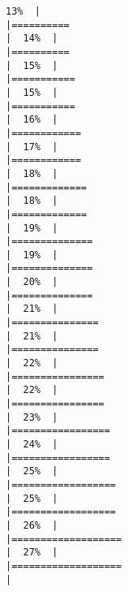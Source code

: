 \documentclass[
]{book}
\begin{document}
\begin{verbatim}
13%  |                                                                              |==========                                                            |  14%  |                                                                              |==========                                                            |  15%  |                                                                              |===========                                                           |  15%  |                                                                              |===========                                                           |  16%  |                                                                              |============                                                          |  17%  |                                                                              |============                                                          |  18%  |                                                                              |=============                                                         |  18%  |                                                                              |=============                                                         |  19%  |                                                                              |==============                                                        |  19%  |                                                                              |==============                                                        |  20%  |                                                                              |==============                                                        |  21%  |                                                                              |===============                                                       |  21%  |                                                                              |===============                                                       |  22%  |                                                                              |================                                                      |  22%  |                                                                              |================                                                      |  23%  |                                                                              |=================                                                     |  24%  |                                                                              |=================                                                     |  25%  |                                                                              |==================                                                    |  25%  |                                                                              |==================                                                    |  26%  |                                                                              |===================                                                   |  27%  |                                                                              |===================                                                   |  
\end{verbatim}
\end{document}
